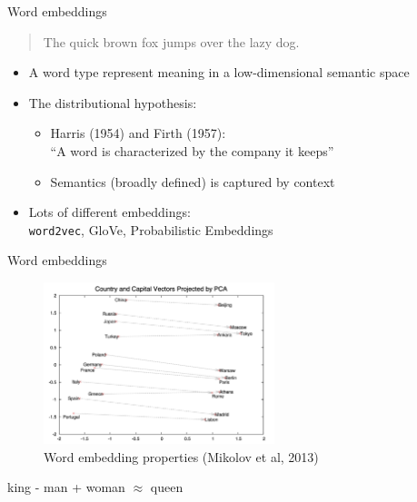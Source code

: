 \documentclass[10pt]{beamer}
\begin{document}
\begin{frame}{Word embeddings}

\begin{quote}%
  The quick brown fox jumps over the lazy dog.
\end{quote}

\begin{itemize}
\item A word type represent {\color{uured} meaning in a low-dimensional semantic space}
\item The distributional hypothesis:
\begin{itemize}
  \item Harris (1954) and Firth (1957): \\ ``A word is characterized by the company it keeps''
  \item Semantics (broadly defined) is captured by  {\color{uured} context}
\end{itemize}
\item Lots of different embeddings: \\ \texttt{word2vec}, GloVe, Probabilistic Embeddings
\end{itemize}


\end{frame}


\begin{frame}{Word embeddings}

\begin{figure}[h]
\centering
\includegraphics[width=0.6\textwidth]{fig/Mikolov_2013_word_projections.png}
\caption{Word embedding properties (Mikolov et al, 2013)}
\end{figure}

king - man + woman $\approx$ queen

\end{frame}
\end{document}
